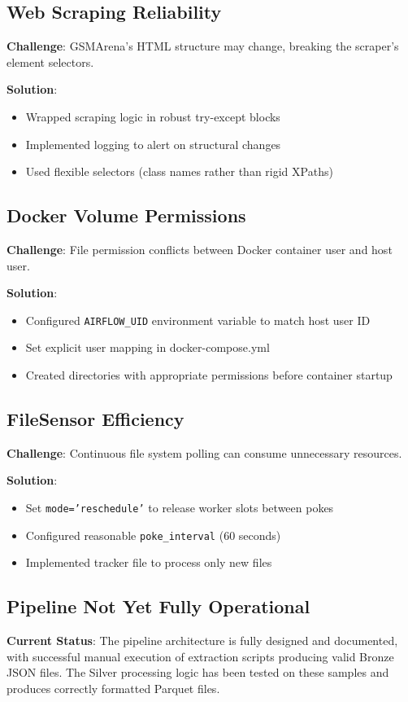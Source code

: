 \documentclass[11pt,a4paper]{article}
\begin{document}
\subsection{Web Scraping Reliability}
\textbf{Challenge}: GSMArena's HTML structure may change, breaking the scraper's element selectors.

\textbf{Solution}:
\begin{itemize}
    \item Wrapped scraping logic in robust try-except blocks
    \item Implemented logging to alert on structural changes
    \item Used flexible selectors (class names rather than rigid XPaths)
\end{itemize}

\subsection{Docker Volume Permissions}
\textbf{Challenge}: File permission conflicts between Docker container user and host user.

\textbf{Solution}:
\begin{itemize}
    \item Configured \texttt{AIRFLOW\_UID} environment variable to match host user ID
    \item Set explicit user mapping in docker-compose.yml
    \item Created directories with appropriate permissions before container startup
\end{itemize}

\subsection{FileSensor Efficiency}
\textbf{Challenge}: Continuous file system polling can consume unnecessary resources.

\textbf{Solution}:
\begin{itemize}
    \item Set \texttt{mode='reschedule'} to release worker slots between pokes
    \item Configured reasonable \texttt{poke\_interval} (60 seconds)
    \item Implemented tracker file to process only new files
\end{itemize}

\subsection{Pipeline Not Yet Fully Operational}
\textbf{Current Status}: The pipeline architecture is fully designed and documented, with successful manual execution of extraction scripts producing valid Bronze JSON files. The Silver processing logic has been tested on these samples and produces correctly formatted Parquet files.
\end{document}

